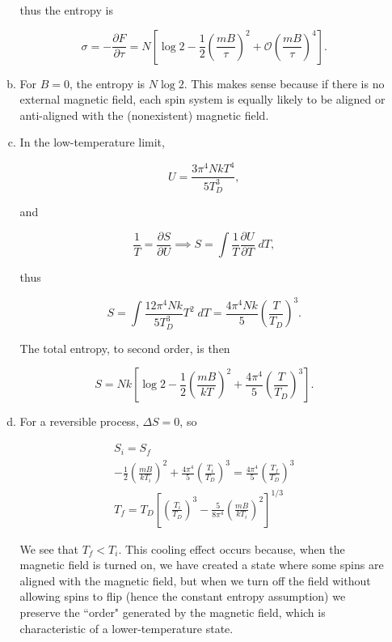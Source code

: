 \documentclass{article}
\begin{document}
\begin{enumerate}
\begin{enumerate}[(a)]
		thus the entropy is

		$$\sigma = -\frac{\partial F}{\partial \tau} = N\left[ \log 2 - \frac{1}{2}\left(\frac{mB}{\tau} \right)^2 + \mathcal{O}\left( \frac{mB}{\tau} \right)^4 \right].$$

		\item

		For $B = 0$, the entropy is $N \log 2$. This makes sense because if there is no external magnetic field, each spin system is equally likely to be aligned or anti-aligned with the (nonexistent) magnetic field.

		\item

		In the low-temperature limit, 

		$$U = \frac{3 \pi^4 N k T^4}{5 T_D^3},$$

		and

		$$\frac{1}{T} = \frac{\partial S}{\partial U} \implies S = \int \frac{1}{T} \frac{\partial U}{\partial T} \; dT,$$

		thus

		$$S = \int \frac{12 \pi^4 N k}{5 T_D^3} T^2 \; dT = \frac{4 \pi^4 N k}{5} \left( \frac{T}{T_D} \right)^3.$$

		The total entropy, to second order, is then

		$$S = Nk \left[ \log 2 - \frac{1}{2} \left( \frac{mB}{kT} \right)^2 + \frac{4 \pi^4}{5} \left( \frac{T}{T_D} \right)^3 \right].$$

		\item 

		For a reversible process, $\Delta S = 0$, so

		\begin{gather*}
		S_i = S_f \\
		- \frac{1}{2} \left( \frac{mB}{kT_i} \right)^2 + \frac{4 \pi^4}{5} \left( \frac{T_i}{T_D} \right)^3 =  \frac{4 \pi^4}{5} \left( \frac{T_f}{T_D} \right)^3 \\
		T_f = T_D \left[ \left(\frac{T_i}{T_D} \right)^3 - \frac{5}{8\pi^4} \left( \frac{mB}{kT_i} \right)^2 \right]^{1/3}
		\end{gather*}

		We see that $T_f < T_i$. This cooling effect occurs because, when the magnetic field is turned on, we have created a state where some spins are aligned with the magnetic field, but when we turn off the field without allowing spins to flip (hence the constant entropy assumption) we preserve the ``order" generated by the magnetic field, which is characteristic of a lower-temperature state.


\end{enumerate}
\end{enumerate}
\end{document}
